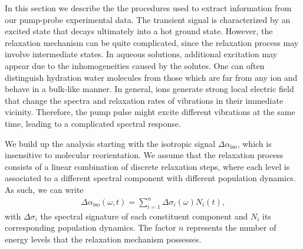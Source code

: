 In this section we describe the the procedures used to extract information from our pump-probe experimental data. The transient signal is characterized by an excited state that decays ultimately into a hot ground state. However, the relaxation mechanism can be quite complicated, since the relaxation process may involve intermediate states. In aqueous solutions, additional excitation may appear due to the inhomogeneities caused by the solutes. One can often distinguish hydration water molecules from those which are far from any ion and behave in a bulk-like manner. In general, ions generate strong local electric field that change the spectra and relaxation rates of vibrations in their immediate vicinity. Therefore, the pump pulse might excite different vibrations at the same time, leading to a complicated spectral response.


We build up the analysis starting with the isotropic signal $\Delta \alpha_{\text{iso}}$, which is insensitive to molecular reorientation. We assume that the relaxation process consists of a linear combination of discrete relaxation steps, where each level is associated to a different spectral component with different population dynamics. As such, we can write
\begin{eqnarray}
\Delta \alpha_{\text{iso}} (\omega, t) = \sum_{i=1}^n \Delta\sigma_i({\omega}) N_i (t),
\label{linearcombiso}
\end{eqnarray}
with $\Delta\sigma_i$ the spectral signature of each constituent component and $N_i$ its corresponding population dynamics. The factor $n$ represents the number of energy levels that the relaxation mechanism possesses.

